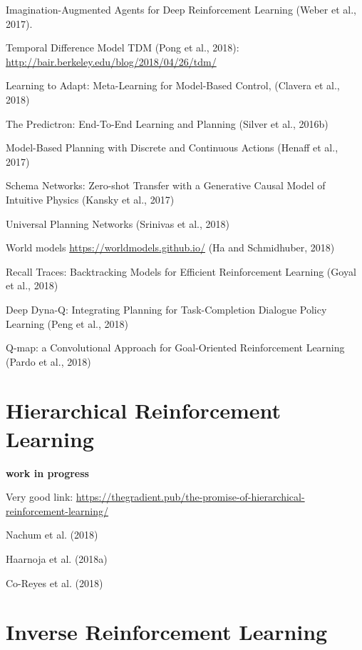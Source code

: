 \documentclass[
  letterpaper,
  DIV=11,
  numbers=noendperiod]{scrreprt}
\begin{document}
Imagination-Augmented Agents for Deep Reinforcement Learning (Weber et
al., 2017).

Temporal Difference Model TDM (Pong et al., 2018):
\url{http://bair.berkeley.edu/blog/2018/04/26/tdm/}

Learning to Adapt: Meta-Learning for Model-Based Control, (Clavera et
al., 2018)

The Predictron: End-To-End Learning and Planning (Silver et al., 2016b)

Model-Based Planning with Discrete and Continuous Actions (Henaff et
al., 2017)

Schema Networks: Zero-shot Transfer with a Generative Causal Model of
Intuitive Physics (Kansky et al., 2017)

Universal Planning Networks (Srinivas et al., 2018)

World models \url{https://worldmodels.github.io/} (Ha and Schmidhuber,
2018)

Recall Traces: Backtracking Models for Efficient Reinforcement Learning
(Goyal et al., 2018)

Deep Dyna-Q: Integrating Planning for Task-Completion Dialogue Policy
Learning (Peng et al., 2018)

Q-map: a Convolutional Approach for Goal-Oriented Reinforcement Learning
(Pardo et al., 2018)


\hypertarget{hierarchical-reinforcement-learning}{%
\chapter{Hierarchical Reinforcement
Learning}\label{hierarchical-reinforcement-learning}}

\textbf{work in progress}

Very good link:
\url{https://thegradient.pub/the-promise-of-hierarchical-reinforcement-learning/}

Nachum et al. (2018)

Haarnoja et al. (2018a)

Co-Reyes et al. (2018)


\hypertarget{inverse-reinforcement-learning}{%
\chapter{Inverse Reinforcement
Learning}\label{inverse-reinforcement-learning}}
\end{document}
